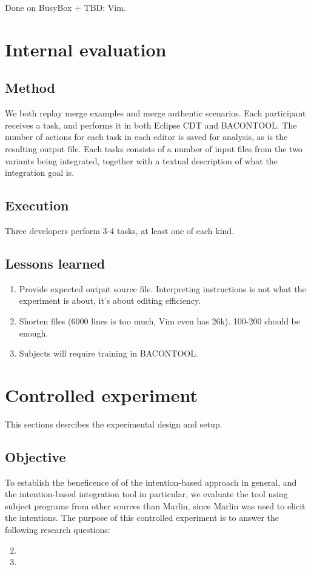 Done on BusyBox + TBD: Vim.

\section{Internal evaluation}
\subsection{Method}
We both replay merge examples and merge authentic scenarios. Each participant receives a task, and performs it in both Eclipse CDT and BACONTOOL. The number of actions for each task in each editor is saved for analysis, as is the resulting output file. Each tasks consists of a number of input files from the two variants being integrated, together with a textual description of what the integration goal is.

\subsection{Execution}
Three developers perform 3-4 tasks, at least one of each kind.

\subsection{Lessons learned}
\begin{enumerate}
    \item Provide expected output source file. Interpreting instructions is not what the experiment is about, it's about editing efficiency.
    \item Shorten files (6000 lines is too much, Vim even has 26k). 100-200 should be enough.
    \item Subjects will require training in BACONTOOL.
\end{enumerate}

\section{Controlled experiment}
This sections desrcibes the experimental design and setup.

\subsection{Objective}
To establish the beneficence of of the intention-based approach in general, and the intention-based integration tool in particular, we evaluate the tool using subject programs from other sources than Marlin, since Marlin was used to elicit the intentions. The purpose of this controlled experiment is to answer the following research questions:
\begin{enumerate}[label={Q\arabic*}]
    \setcounter{enumi}{1}
    \item \RQB {}
    \item \RQC
\end{enumerate}

